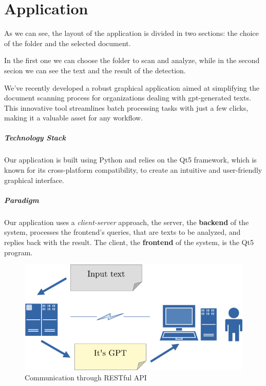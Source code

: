 \chapter{Application}

As we can see, the layout of the application is divided in two sections: the choice of the folder and the selected document.

In the first one we can choose the folder to scan and analyze, while in the second secion we can see the text and the
result of the detection.


We've recently developed a robust graphical application aimed at simplifying the document scanning process for 
organizations dealing with gpt-generated texts. This innovative tool streamlines batch processing tasks with just 
a few clicks, making it a valuable asset for any workflow.

\paragraph{Technology Stack} Our application is built using Python and relies on the Qt5 framework, which is known 
for its cross-platform compatibility, to create an intuitive and user-friendly graphical interface.

\paragraph{Paradigm}
Our application uses a \textit{client-server} approach, the server, the \textbf{backend} of the system, processes the frontend's queries, that are texts to be analyzed, and replies back with the result. The client, the \textbf{frontend} of the system, is the Qt5 program.

\begin{figure}
	\centering
	\includegraphics[width=0.7\linewidth]{images/Application/diagramma}
	\caption{Communication through RESTful API}
	\label{fig:diagramma}
\end{figure}

